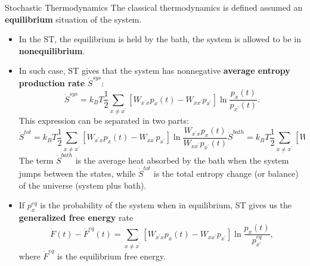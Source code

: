 \documentclass[final]{beamer}
\newlength{\colwidth}
\begin{document}
\begin{frame}[t]
\begin{columns}[t]
\begin{column}{\colwidth}
\begin{block}{Stochastic Thermodynamics}
The classical thermodynamics is defined assumed an {\bf equilibrium} situation of the system.
\begin{itemize}
\item In the ST, the equilibrium is held by the bath, the system is allowed to be in {\bf nonequilibrium}.
\item In such case, ST gives that the system has nonnegative {\bf average entropy production rate} $\dot{S}^{sys}$:
%
\begin{equation}
\dot{S}^{sys} = k_B T \frac{1}{2} \sum_{x \neq x^\prime} \left[ W_{x^\prime x} p_x(t) -  W_{x x^\prime}p_{x^\prime} \right] \ln \frac{p_x(t)}{p_{x^\prime}(t)}.
\end{equation}
%
This expression can be separated in two parts:
\begin{subequations}
\begin{equation}
\dot{S}^{tot}  = k_B T\frac{1}{2} \sum_{x \neq x^\prime} \left[ W_{x^\prime x} p_x(t) -  W_{x x^\prime}p_{x^\prime} \right] \ln \frac{W_{x^\prime x} p_x(t)}{W_{xx^\prime}p_{x^\prime}(t)}
\end{equation}
\begin{equation}
\dot{S}^{bath}  = k_B T \frac{1}{2} \sum_{x \neq x^\prime} \left[ W_{x^\prime x} p_x(t) -  W_{x x^\prime}p_{x^\prime}(t) \right] \ln \frac{W_{x^\prime x}}{W_{xx^\prime}}
\end{equation}
\end{subequations}
The term $\dot{S}^{bath}$ is the average heat absorbed by the bath when the system jumps between the states, while $\dot{S}^{tot}$ is the total entropy change (or balance) of the universe (system plus bath).

\item If $p_x^{eq}$ is the probability of the system when in equilibrium, ST gives us the {\bf generalized free energy} rate\cite{Qian_2021}
%
\begin{equation}
\label{eq noneq free en}
\dot{F}(t) - \dot{F}^{eq}(t)= \sum_{x \neq x^\prime} \left[ W_{x^\prime x} p_x(t) -  W_{x x^\prime}p_{x^\prime} \right] \ln \frac{p_x(t)}{p_{x^\prime}^{eq}},
\end{equation}
%
where $\dot{F}^{eq}$ is the equilibrium free energy.


\end{itemize}
\end{block}
\end{column}
\end{columns}
\end{frame}
\end{document}
